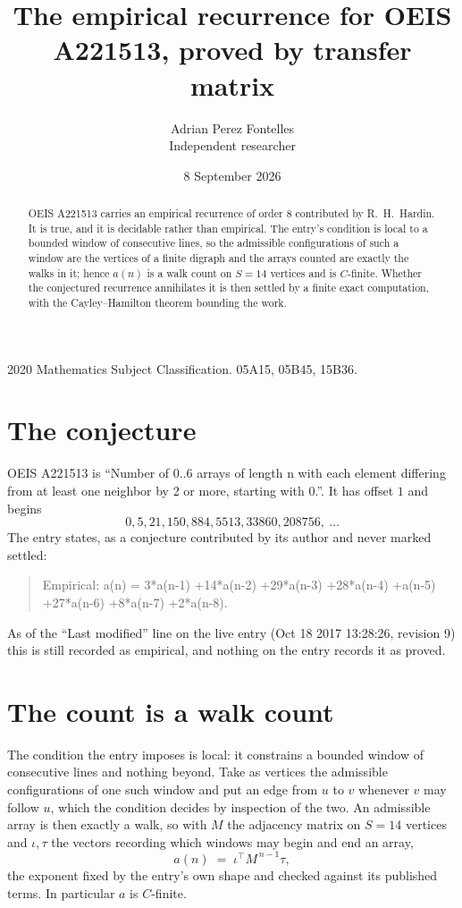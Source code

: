 \documentclass[11pt,a4paper]{article}
\title{The empirical recurrence for OEIS A221513, proved by transfer matrix}
\author{Adrian Perez Fontelles\\ \small Independent researcher}
\date{8 September 2026}
\theoremstyle{plain}
\theoremstyle{definition}
\begin{document}
\maketitle

\begin{abstract}
OEIS A221513 carries an empirical recurrence of order $8$ contributed by R.~H.~Hardin. It is
true, and it is decidable rather than empirical. The entry's condition is local to a bounded window of consecutive lines, so
the admissible configurations of such a window are the vertices of a finite digraph and the
arrays counted are exactly the walks in it; hence $a(n)$ is a walk count on $S=14$ vertices
and is $C$-finite. Whether the conjectured recurrence annihilates it is then settled by a
finite exact computation, with the Cayley--Hamilton theorem bounding the work.
\end{abstract}

\noindent\small 2020 Mathematics Subject Classification. 05A15, 05B45, 15B36.\normalsize

\section{The conjecture}

OEIS A221513 is ``Number of 0..6 arrays of length n with each element differing from at least one neighbor by 2 or more, starting with 0.''. It has offset $1$ and begins
\[
0, 5, 21, 150, 884, 5513, 33860, 208756,\ \dots
\]
The entry states, as a conjecture contributed by its author and never marked settled:
\begin{quote}
Empirical: a(n) = 3*a(n-1) +14*a(n-2) +29*a(n-3) +28*a(n-4) +a(n-5) +27*a(n-6) +8*a(n-7) +2*a(n-8).
\end{quote}
As of the ``Last modified'' line on the live entry (Oct 18 2017 13:28:26, revision 9) this is still
recorded as empirical, and nothing on the entry records it as proved.

\section{The count is a walk count}

The condition the entry imposes is local: it constrains a bounded window of consecutive lines and nothing beyond. Take as
vertices the admissible configurations of one such window and put an edge from $u$ to $v$
whenever $v$ may follow $u$, which the condition decides by inspection of the two. An
admissible array is then exactly a walk, so with $M$ the adjacency matrix on $S=14$ vertices
and $\iota,\tau$ the vectors recording which windows may begin and end an array,
\[
a(n)\;=\;\iota^{\!\top}M^{\,n-1}\tau ,
\]
the exponent fixed by the entry's own shape and checked against its published terms. In
particular $a$ is $C$-finite.
\end{document}
